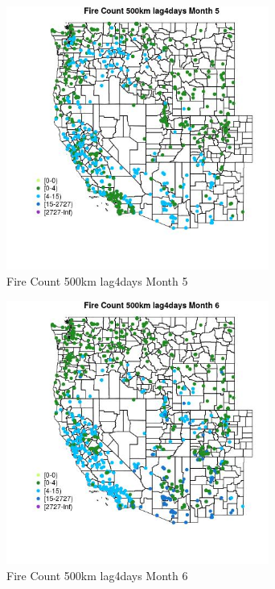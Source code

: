 \begin{figure} 
\centering  
\includegraphics[width=0.77\textwidth]{Code_Outputs/Report_ML_input_PM25_Step4_part_f_de_duplicated_aves_prioritize_24hr_obswNAs_MapObsMo5Fire_Count_500km_lag4days.jpg} 
\caption{\label{fig:Report_ML_input_PM25_Step4_part_f_de_duplicated_aves_prioritize_24hr_obswNAsMapObsMo5Fire_Count_500km_lag4days}Fire Count 500km lag4days Month 5} 
\end{figure} 
 

\begin{figure} 
\centering  
\includegraphics[width=0.77\textwidth]{Code_Outputs/Report_ML_input_PM25_Step4_part_f_de_duplicated_aves_prioritize_24hr_obswNAs_MapObsMo6Fire_Count_500km_lag4days.jpg} 
\caption{\label{fig:Report_ML_input_PM25_Step4_part_f_de_duplicated_aves_prioritize_24hr_obswNAsMapObsMo6Fire_Count_500km_lag4days}Fire Count 500km lag4days Month 6} 
\end{figure} 
 

